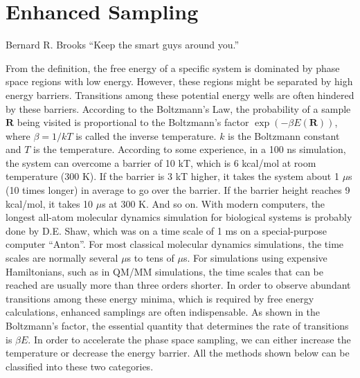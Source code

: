 \chapter{Enhanced Sampling\label{chapter:ES}}
\begin{chapquote}{Bernard R. Brooks%
	}
	``Keep the smart guys around you.''
\end{chapquote}
From the definition, the free energy of a specific system is dominated by phase space regions with low energy. However, these regions might be separated by high energy barriers. Transitions among these potential energy wells are often hindered by these barriers. According to the Boltzmann's Law, the probability of a sample $\mathbf{R}$ being visited is proportional to the Boltzmann's factor $\exp{(-\beta E(\mathbf{R}))}$, where $\beta=1/kT$ is called the inverse temperature. $k$ is the Boltzmann constant and $T$ is the temperature. According to some experience, in a 100 ns simulation, the system can overcome a barrier of 10 kT, which is 6 kcal/mol at room temperature (300 K). If the barrier is 3 kT higher, it takes the system about 1 $\mu$s (10 times longer) in average to go over the barrier. If the barrier height reaches 9 kcal/mol, it takes 10 $\mu$s at 300 K. And so on. With modern computers, the longest all-atom molecular dynamics simulation for biological systems is probably done by D.E. Shaw, which was on a time scale of 1 ms on a special-purpose computer ``Anton''. For most classical molecular dynamics simulations, the time scales are normally several $\mu$s to tens of $\mu$s. For simulations using expensive Hamiltonians, such as in QM/MM simulations, the time scales that can be reached are usually more than three orders shorter. In order to observe abundant transitions among these energy minima, which is required by free energy calculations, enhanced samplings are often indispensable. As shown in the Boltzmann's factor, the essential quantity that determines the rate of transitions is $\beta E$. In order to accelerate the phase space sampling, we can either increase the temperature or decrease the energy barrier. All the methods shown below can be classified into these two categories. 
 



